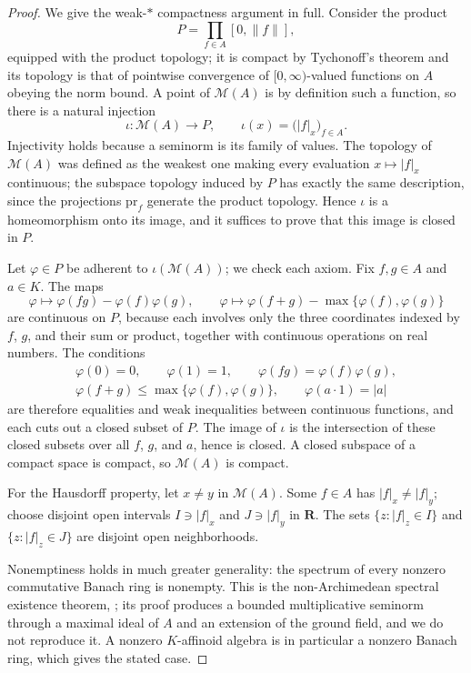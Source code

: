 \begin{proof}
We give the weak-$*$ compactness argument in full.  Consider the product
\[
                     P=\prod_{f\in A}[0,\|f\|],
\]
equipped with the product topology; it is compact by Tychonoff's theorem
\cite[Chapter~5]{Kel75} and its topology is that of pointwise convergence
of $[0,\infty)$-valued functions on $A$ obeying the norm bound.  A
point of $\mathcal M(A)$ is by definition such a function, so there is a
natural injection
\[
 \iota:\mathcal M(A)\longrightarrow P,
 \qquad
 \iota(x)=\bigl(|f|_x\bigr)_{f\in A}.
\]
Injectivity holds because a seminorm is its family of values.  The
topology of $\mathcal M(A)$ was defined as the weakest one making every
evaluation $x\mapsto|f|_x$ continuous; the subspace topology induced by
$P$ has exactly the same description, since the projections
$\mathrm{pr}_f$ generate the product topology.  Hence $\iota$ is a
homeomorphism onto its image, and it suffices to prove that this image is
closed in $P$.

Let $\varphi\in P$ be adherent to $\iota(\mathcal M(A))$; we check
each axiom.  Fix $f,g\in A$ and $a\in K$.  The maps
\[
 \varphi\longmapsto\varphi(fg)-\varphi(f)\varphi(g),
 \qquad
 \varphi\longmapsto\varphi(f+g)-\max\{\varphi(f),\varphi(g)\}
\]
are continuous on $P$, because each involves only the three coordinates
indexed by $f$, $g$, and their sum or product, together with
 continuous operations on real numbers.  The conditions
 \[
 \begin{gathered}
 \varphi(0)=0,\qquad \varphi(1)=1,
 \qquad \varphi(fg)=\varphi(f)\varphi(g),\\
 \varphi(f+g)\leq\max\{\varphi(f),\varphi(g)\},
 \qquad \varphi(a\cdot1)=|a|
 \end{gathered}
 \]
are therefore equalities and weak inequalities between continuous
functions, and each cuts out a closed subset of $P$.  The image of
$\iota$ is the intersection of these closed subsets over all $f$,
$g$, and $a$, hence is closed.  A closed subspace of a compact space
is compact, so $\mathcal M(A)$ is compact.

For the Hausdorff property, let $x\neq y$ in $\mathcal M(A)$.  Some
$f\in A$ has $|f|_x\neq|f|_y$; choose disjoint open intervals
$I\ni|f|_x$ and $J\ni|f|_y$ in $\mathbf R$.  The sets
$\{z:|f|_z\in I\}$ and $\{z:|f|_z\in J\}$ are disjoint open
neighborhoods.

Nonemptiness holds in much greater generality: the spectrum of every
nonzero commutative Banach ring is nonempty.  This is the non-Archimedean
spectral existence theorem, \cite[Theorem~1.2.1]{Berk12}; its proof
produces a bounded multiplicative seminorm through a maximal ideal of
$A$ and an extension of the ground field, and we do not reproduce it.
A nonzero $K$-affinoid algebra is in particular a nonzero Banach ring,
which gives the stated case.
\end{proof}

